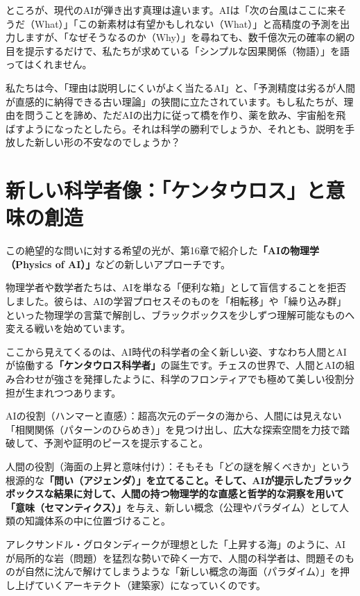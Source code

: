 ところが、現代のAIが弾き出す真理は違います。AIは「次の台風はここに来そうだ（What）」「この新素材は有望かもしれない（What）」と高精度の予測を出力しますが、「なぜそうなるのか（Why）」を尋ねても、数千億次元の確率の網の目を提示するだけで、私たちが求めている「シンプルな因果関係（物語）」を語ってはくれません。

私たちは今、「理由は説明しにくいがよく当たるAI」と、「予測精度は劣るが人間が直感的に納得できる古い理論」の狭間に立たされています。もし私たちが、理由を問うことを諦め、ただAIの出力に従って橋を作り、薬を飲み、宇宙船を飛ばすようになったとしたら。それは科学の勝利でしょうか、それとも、説明を手放した新しい形の不安なのでしょうか？

\section{新しい科学者像：「ケンタウロス」と意味の創造}

この絶望的な問いに対する希望の光が、第16章で紹介した\textbf{「AIの物理学（Physics of AI）」}などの新しいアプローチです。

物理学者や数学者たちは、AIを単なる「便利な箱」として盲信することを拒否しました。彼らは、AIの学習プロセスそのものを「相転移」や「繰り込み群」といった物理学の言葉で解剖し、ブラックボックスを少しずつ理解可能なものへ変える戦いを始めています。

ここから見えてくるのは、AI時代の科学者の全く新しい姿、すなわち人間とAIが協働する\textbf{「ケンタウロス科学者」}の誕生です。チェスの世界で、人間とAIの組み合わせが強さを発揮したように、科学のフロンティアでも極めて美しい役割分担が生まれつつあります。

AIの役割（ハンマーと直感）：超高次元のデータの海から、人間には見えない「相関関係（パターンのひらめき）」を見つけ出し、広大な探索空間を力技で踏破して、予測や証明のピースを提示すること。

人間の役割（海面の上昇と意味付け）：そもそも「どの謎を解くべきか」という根源的な\textbf{「問い（アジェンダ）」を立てること。そして、AIが提示したブラックボックスな結果に対して、人間の持つ物理学的な直感と哲学的な洞察を用いて「意味（セマンティクス）」}を与え、新しい概念（公理やパラダイム）として人類の知識体系の中に位置づけること。

アレクサンドル・グロタンディークが理想とした「上昇する海」のように、AIが局所的な岩（問題）を猛烈な勢いで砕く一方で、人間の科学者は、問題そのものが自然に沈んで解けてしまうような「新しい概念の海面（パラダイム）」を押し上げていくアーキテクト（建築家）になっていくのです。

